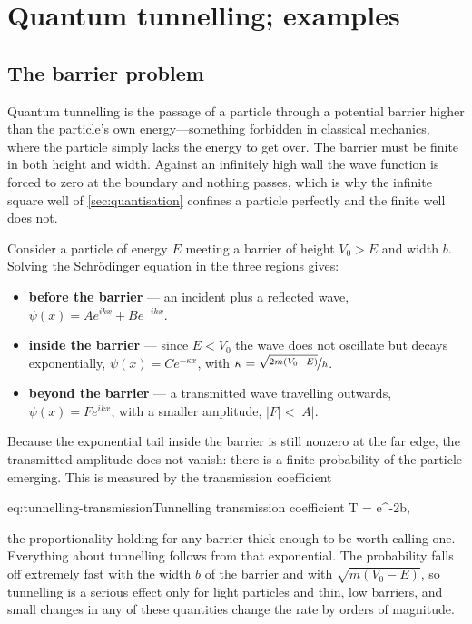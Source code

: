 \section{Quantum tunnelling; examples}
\label{sec:tunnelling}

    \subsection{The barrier problem}

        Quantum tunnelling is the passage of a particle through a potential barrier higher than the particle's own energy---something forbidden in classical mechanics, where the particle simply lacks the energy to get over. The barrier must be finite in both height and width. Against an infinitely high wall the wave function is forced to zero at the boundary and nothing passes, which is why the infinite square well of \cref{sec:quantisation} confines a particle perfectly and the finite well does not.

        Consider a particle of energy $E$ meeting a barrier of height $V_0 > E$ and width $b$. Solving the Schrödinger equation in the three regions gives:

        \begin{itemize}
            \item \textbf{before the barrier} --- an incident plus a reflected wave, $\psi(x) = Ae^{i k x} + Be^{-i k x}$.
            \item \textbf{inside the barrier} --- since $E < V_0$ the wave does not oscillate but decays exponentially, $\psi(x) = Ce^{-\kappa x}$, with $\kappa = \nicefrac{\sqrt{2m(V_0 - E)}}{\hbar}$.
            \item \textbf{beyond the barrier} --- a transmitted wave travelling outwards, $\psi(x) = Fe^{i k x}$, with a smaller amplitude, $|F| < |A|$.
        \end{itemize}

        Because the exponential tail inside the barrier is still nonzero at the far edge, the transmitted amplitude does not vanish: there is a finite probability of the particle emerging. This is measured by the transmission coefficient

        \begin{keyeq}{eq:tunnelling-transmission}{Tunnelling transmission coefficient}
            T =  \propto e^{-2\kappa b},
        \end{keyeq}

        the proportionality holding for any barrier thick enough to be worth calling one. Everything about tunnelling follows from that exponential. The probability falls off extremely fast with the width $b$ of the barrier and with $\sqrt{m(V_{0}-E)}$, so tunnelling is a serious effect only for light particles and thin, low barriers, and small changes in any of these quantities change the rate by orders of magnitude.

